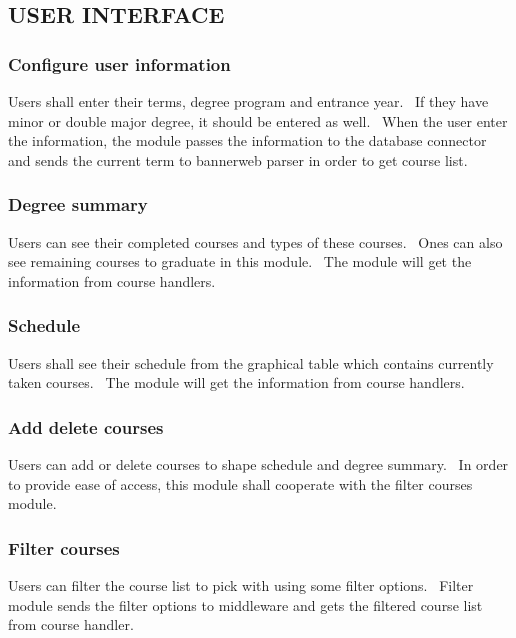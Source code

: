 \documentclass[twoside,letterpaper]{article}
\begin{document}
\subsection[USER INTERFACE]{\rmfamily\bfseries\color{black}
USER INTERFACE}

\subsubsection[Configure user information]{\rmfamily\bfseries\color{black}
Configure user information}
{\color{black}
{Users shall enter their terms, degree program and entrance year. \ If they have minor or double major degree, it should be entered as well. \ When the user enter the information, the module passes the information to the database connector and sends the current term to bannerweb parser in order to get course list.}}

\subsubsection[Degree summary]{\rmfamily\bfseries\color{black}
Degree summary}
{\color{black}
{Users can see their completed courses and types of these courses. \ Ones can also see remaining courses to graduate in this module. \ The module will get the information from course handlers.}}

\subsubsection[Schedule]{\rmfamily\bfseries\color{black}
Schedule}
{\color{black}
{Users shall see their schedule from the graphical table which contains currently taken courses. \ The module will get the information from course handlers.}}

\subsubsection[Add delete courses]{\rmfamily\bfseries\color{black}
Add delete courses}
{\color{black}
{Users can add or delete courses to shape schedule and degree summary. \ In order to provide ease of access, this module shall cooperate with the filter courses module.}}

\subsubsection[Filter courses]{\rmfamily\bfseries\color{black}
Filter courses}
{\color{black}
{Users can filter the course list to pick with using some filter options. \ Filter module sends the filter options to middleware and gets the filtered course list from course handler. }}
\end{document}

